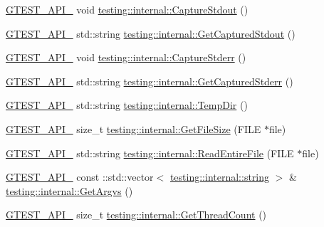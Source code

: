 \begin{DoxyCompactItemize}
\item 
\mbox{\hyperlink{gtest-port_8h_aa73be6f0ba4a7456180a94904ce17790}{G\+T\+E\+S\+T\+\_\+\+A\+P\+I\+\_\+}} void \mbox{\hyperlink{namespacetesting_1_1internal_acba06d4f0343dec407738ba5544af990}{testing\+::internal\+::\+Capture\+Stdout}} ()
\item 
\mbox{\hyperlink{gtest-port_8h_aa73be6f0ba4a7456180a94904ce17790}{G\+T\+E\+S\+T\+\_\+\+A\+P\+I\+\_\+}} std\+::string \mbox{\hyperlink{namespacetesting_1_1internal_aed657219a9856a8d249a3230de0c54ce}{testing\+::internal\+::\+Get\+Captured\+Stdout}} ()
\item 
\mbox{\hyperlink{gtest-port_8h_aa73be6f0ba4a7456180a94904ce17790}{G\+T\+E\+S\+T\+\_\+\+A\+P\+I\+\_\+}} void \mbox{\hyperlink{namespacetesting_1_1internal_a8ec00d458d0d442bd64af7b5f9c22dda}{testing\+::internal\+::\+Capture\+Stderr}} ()
\item 
\mbox{\hyperlink{gtest-port_8h_aa73be6f0ba4a7456180a94904ce17790}{G\+T\+E\+S\+T\+\_\+\+A\+P\+I\+\_\+}} std\+::string \mbox{\hyperlink{namespacetesting_1_1internal_a374156401da17704099d0c33fa53adfb}{testing\+::internal\+::\+Get\+Captured\+Stderr}} ()
\item 
\mbox{\hyperlink{gtest-port_8h_aa73be6f0ba4a7456180a94904ce17790}{G\+T\+E\+S\+T\+\_\+\+A\+P\+I\+\_\+}} std\+::string \mbox{\hyperlink{namespacetesting_1_1internal_a9183d29a7f57e2906d03b644e6a12a4a}{testing\+::internal\+::\+Temp\+Dir}} ()
\item 
\mbox{\hyperlink{gtest-port_8h_aa73be6f0ba4a7456180a94904ce17790}{G\+T\+E\+S\+T\+\_\+\+A\+P\+I\+\_\+}} size\+\_\+t \mbox{\hyperlink{namespacetesting_1_1internal_a40bcfd87e26aae36e0cc51e5db64fd89}{testing\+::internal\+::\+Get\+File\+Size}} (F\+I\+LE $\ast$file)
\item 
\mbox{\hyperlink{gtest-port_8h_aa73be6f0ba4a7456180a94904ce17790}{G\+T\+E\+S\+T\+\_\+\+A\+P\+I\+\_\+}} std\+::string \mbox{\hyperlink{namespacetesting_1_1internal_ab81b0af2a0131ea54dc11de00d5e6e51}{testing\+::internal\+::\+Read\+Entire\+File}} (F\+I\+LE $\ast$file)
\item 
\mbox{\hyperlink{gtest-port_8h_aa73be6f0ba4a7456180a94904ce17790}{G\+T\+E\+S\+T\+\_\+\+A\+P\+I\+\_\+}} const \+::std\+::vector$<$ \mbox{\hyperlink{namespacetesting_1_1internal_a8e8ff5b11e64078831112677156cb111}{testing\+::internal\+::string}} $>$ \& \mbox{\hyperlink{namespacetesting_1_1internal_ad603798345f4e7ccd25368d902c98fc1}{testing\+::internal\+::\+Get\+Argvs}} ()
\item 
\mbox{\hyperlink{gtest-port_8h_aa73be6f0ba4a7456180a94904ce17790}{G\+T\+E\+S\+T\+\_\+\+A\+P\+I\+\_\+}} size\+\_\+t \mbox{\hyperlink{namespacetesting_1_1internal_a8cbd8bf820517923d7f3c4477b3af5fa}{testing\+::internal\+::\+Get\+Thread\+Count}} ()

\end{DoxyCompactItemize}
